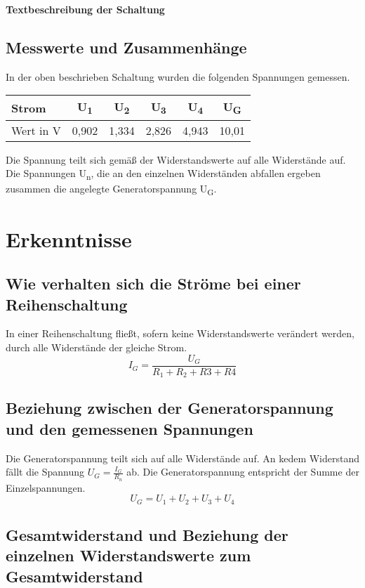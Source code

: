\documentclass[
a4paper,     %
12pt         %
]{scrartcl}  %
\begin{document}
\textbf{Textbeschreibung der Schaltung}

\subsection{Messwerte und Zusammenhänge}
In der oben beschrieben Schaltung wurden die folgenden Spannungen gemessen.
\begin{center}
  \begin{tabular}{ l | c | c | c | c | c}
    \hline
    Strom      & U\textsubscript{1} & U\textsubscript{2} & U\textsubscript{3} & U\textsubscript{4} & U\textsubscript{G} \\ \hline
    Wert in V  & 0,902 & 1,334 & 2,826 & 4,943 & 10,01 \\
    \hline
  \end{tabular}
\end{center}
Die Spannung teilt sich gemäß der Widerstandswerte auf alle Widerstände auf. Die Spannungen U\textsubscript{n}, die an den einzelnen Widerständen abfallen ergeben zusammen die angelegte Generatorspannung U\textsubscript{G}.

\section{Erkenntnisse}

\subsection{Wie verhalten sich die Ströme bei einer Reihenschaltung}
In einer Reihenschaltung fließt, sofern keine Widerstandswerte verändert werden, durch alle Widerstände der gleiche Strom.\\
\[I_{G}=\frac{U_{G}}{R_{1}+R_{2}+R{3}+R{4}}\]

\subsection{Beziehung zwischen der Generatorspannung und den gemessenen Spannungen}
Die Generatorspannung teilt sich auf alle Widerstände auf. An kedem Widerstand fällt die Spannung $U_{G}=\frac{I_{G}}{R_{n}} $ ab. Die Generatorspannung entspricht der Summe der Einzelspannungen.
\[U_{G}=U_{1}+U_{2}+U_{3}+U_{4}\]

\subsection{Gesamtwiderstand und Beziehung der einzelnen Widerstandswerte zum Gesamtwiderstand}
\end{document}
